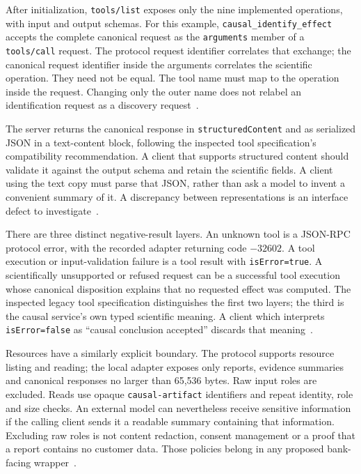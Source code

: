 After initialization, \texttt{tools/list} exposes only the nine implemented
operations, with input and output schemas. For this example,
\texttt{causal\_identify\_effect} accepts the complete canonical request as
the \texttt{arguments} member of a \texttt{tools/call} request. The protocol
request identifier correlates that exchange; the canonical request identifier
inside the arguments correlates the scientific operation. They need not be
equal. The tool name must map to the operation inside the request. Changing
only the outer name does not relabel an identification request as a discovery
request~\citep{v12_in_runtime}.

The server returns the canonical response in \texttt{structuredContent} and
as serialized JSON in a text-content block, following the inspected tool
specification's compatibility recommendation. A client that supports
structured content should validate it against the output schema and retain
the scientific fields. A client using the text copy must parse that JSON,
rather than ask a model to invent a convenient summary of it. A discrepancy
between representations is an interface defect to investigate~\citep{v12_mcp_legacy_tools,v12_in_runtime}.

There are three distinct negative-result layers. An unknown tool is a
JSON-RPC protocol error, with the recorded adapter returning code $-32602$.
A tool execution or input-validation failure is a tool result with
\texttt{isError=true}. A scientifically unsupported or refused request can
be a successful tool execution whose canonical disposition explains that
no requested effect was computed. The inspected legacy tool specification
distinguishes the first two layers; the third is the causal service's own
typed scientific meaning. A client which interprets
\texttt{isError=false} as ``causal conclusion accepted'' discards that meaning~\citep{v12_mcp_legacy_tools,exec13_i2_examples}.

Resources have a similarly explicit boundary. The protocol supports resource
listing and reading; the local adapter exposes only reports, evidence
summaries and canonical responses no larger than 65,536 bytes. Raw input
roles are excluded. Reads use opaque \texttt{causal-artifact} identifiers
and repeat identity, role and size checks. An external model can nevertheless
receive sensitive information if the calling client sends it a readable
summary containing that information. Excluding raw roles is not content
redaction, consent management or a proof that a report contains no customer
data. Those policies belong in any proposed bank-facing wrapper~\citep{v12_mcp_legacy_resources,v12_in_runtime}.

